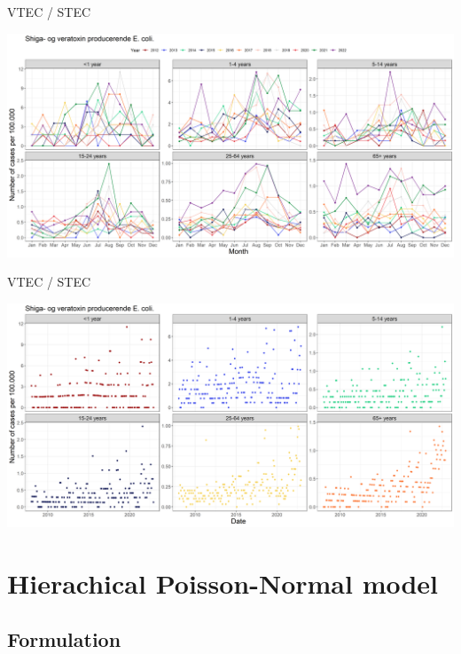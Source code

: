 \documentclass[aspectratio=169]{beamer}
\begin{document}
\begin{frame}{VTEC / STEC}
\protect\hypertarget{vtec-stec-2}{}
\tiny

\includegraphics[width=1\linewidth]{../figures/STECxEpixAgeGroup}

\normalsize
\end{frame}

\begin{frame}{VTEC / STEC}
\protect\hypertarget{vtec-stec-3}{}
\tiny

\includegraphics[width=1\linewidth]{../figures/ShigaogveratoxinproducerendeEcolixAgeGroup}

\normalsize
\end{frame}

\hypertarget{hierachical-poisson-normal-model}{%
\section{Hierachical Poisson-Normal
model}\label{hierachical-poisson-normal-model}}

\hypertarget{formulation}{%
\subsection{Formulation}\label{formulation}}
\end{document}
